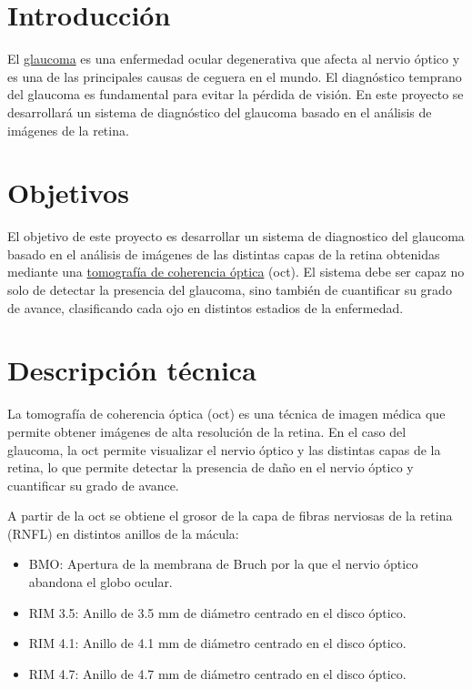 \documentclass[
  a4paper,
]{scrreport}
\providecommand{\tightlist}{%
  \setlength{\itemsep}{0pt}\setlength{\parskip}{0pt}}\usepackage{longtable,booktabs,array}
\begin{document}
\hypertarget{introducciuxf3n}{%
\section{Introducción}\label{introducciuxf3n}}

El \href{https://es.wikipedia.org/wiki/Glaucoma}{glaucoma} es una
enfermedad ocular degenerativa que afecta al nervio óptico y es una de
las principales causas de ceguera en el mundo. El diagnóstico temprano
del glaucoma es fundamental para evitar la pérdida de visión. En este
proyecto se desarrollará un sistema de diagnóstico del glaucoma basado
en el análisis de imágenes de la retina.

\hypertarget{objetivos}{%
\section{Objetivos}\label{objetivos}}

El objetivo de este proyecto es desarrollar un sistema de diagnostico
del glaucoma basado en el análisis de imágenes de las distintas capas de
la retina obtenidas mediante una
\href{https://es.wikipedia.org/wiki/Tomograf\%C3\%ADa_de_coherencia_\%C3\%B3ptica}{tomografía
de coherencia óptica} (oct). El sistema debe ser capaz no solo de
detectar la presencia del glaucoma, sino también de cuantificar su grado
de avance, clasificando cada ojo en distintos estadios de la enfermedad.

\hypertarget{descripciuxf3n-tuxe9cnica}{%
\section{Descripción técnica}\label{descripciuxf3n-tuxe9cnica}}

La tomografía de coherencia óptica (oct) es una técnica de imagen médica
que permite obtener imágenes de alta resolución de la retina. En el caso
del glaucoma, la oct permite visualizar el nervio óptico y las distintas
capas de la retina, lo que permite detectar la presencia de daño en el
nervio óptico y cuantificar su grado de avance.

A partir de la oct se obtiene el grosor de la capa de fibras nerviosas
de la retina (RNFL) en distintos anillos de la mácula:

\begin{itemize}
\tightlist
\item
  BMO: Apertura de la membrana de Bruch por la que el nervio óptico
  abandona el globo ocular.
\item
  RIM 3.5: Anillo de 3.5 mm de diámetro centrado en el disco óptico.
\item
  RIM 4.1: Anillo de 4.1 mm de diámetro centrado en el disco óptico.
\item
  RIM 4.7: Anillo de 4.7 mm de diámetro centrado en el disco óptico.
\end{itemize}
\end{document}
